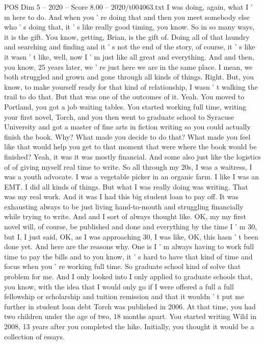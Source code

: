 \begin{textsample}{POS Dim 5 – 2020 – Score 8.00 – 2020/t004063.txt}
I was doing, again, what I ' m here to do.
And when you ' re doing that and then you meet somebody else who ' s doing that, it ' s like really good timing, you know.
So in so many ways, it is the gift.
You know, getting, Brian, is the gift of.
Doing all of that laundry and searching and finding and it ' s not the end of the story, of course, it ' s like it wasn ' t like, well, now I ' m just like all great and everything.
And and then, you know, 25 years later, we ' re just here we are in the same place.
I mean, we both struggled and grown and gone through all kinds of things.
Right.
But, you know, to make yourself ready for that kind of relationship, I wasn ' t walking the trail to do that.
But that was one of the outcomes of it.
Yeah.
You moved to Portland, you got a job waiting tables.
You started working full time, writing your first novel, Torch, and you then went to graduate school to Syracuse University and got a master of fine arts in fiction writing so you could actually finish the book.
Why?
What made you decide to do that?
What made you feel like that would help you get to that moment that were where the book would be finished?
Yeah, it was it was mostly financial.
And some also just like the logistics of of giving myself real time to write.
So all through my 20s, I was a waitress, I was a youth advocate.
I was a vegetable picker in an organic farm.
I like I was an EMT.
I did all kinds of things.
But what I was really doing was writing.
That was my real work.
And it was I had this big student loan to pay off.
It was exhausting always to be just living hand-to-mouth and struggling financially while trying to write.
And and I sort of always thought like.
OK, my my first novel will, of course, be published and done and everything by the time I ' m 30, but I, I just said, OK, as I was approaching 30, I was like, OK, this hasn ' t been done yet.
And here are the reasons why.
One is I ' m always having to work full time to pay the bills and to you know, it ' s hard to have that kind of time and focus when you ' re working full time.
So graduate school kind of solve that problem for me.
And I only looked into I only applied to graduate schools that, you know, with the idea that I would only go if I were offered a full a full fellowship or scholarship and tuition remission and that it wouldn ' t put me further in student loan debt Torch was published in 2006.
At that time, you had two children under the age of two, 18 months apart.
You started writing Wild in 2008, 13 years after you completed the hike.
Initially, you thought it would be a collection of essays.

\end{textsample}
